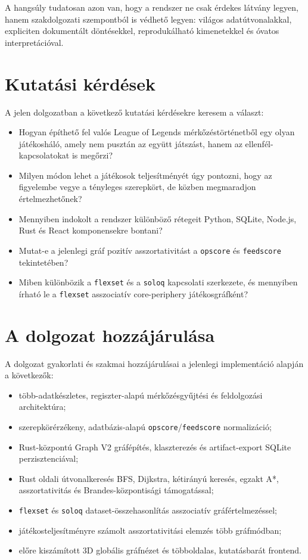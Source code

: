 ﻿\documentclass[a4paper,12pt]{report}
\begin{document}
A hangsúly tudatosan azon van, hogy a rendszer ne csak érdekes látvány legyen, hanem szakdolgozati szempontból is védhető legyen: világos adatútvonalakkal, expliciten dokumentált döntésekkel, reprodukálható kimenetekkel és óvatos interpretációval.

\section{Kutatási kérdések}

A jelen dolgozatban a következő kutatási kérdésekre keresem a választ:

\begin{itemize}
    \item Hogyan építhető fel valós League of Legends mérkőzéstörténetből egy olyan játékosháló, amely nem pusztán az együtt játszást, hanem az ellenfél-kapcsolatokat is megőrzi?
    \item Milyen módon lehet a játékosok teljesítményét úgy pontozni, hogy az figyelembe vegye a tényleges szerepkört, de közben megmaradjon értelmezhetőnek?
    \item Mennyiben indokolt a rendszer különböző rétegeit Python, SQLite, Node.js, Rust és React komponensekre bontani?
    \item Mutat-e a jelenlegi gráf pozitív asszortativitást a \texttt{opscore} és \texttt{feedscore} tekintetében?
    \item Miben különbözik a \texttt{flexset} és a \texttt{soloq} kapcsolati szerkezete, és mennyiben írható le a \texttt{flexset} asszociatív core-periphery játékosgráfként?
\end{itemize}

\section{A dolgozat hozzájárulása}

A dolgozat gyakorlati és szakmai hozzájárulásai a jelenlegi implementáció alapján a következők:

\begin{itemize}
    \item több-adatkészletes, regiszter-alapú mérkőzésgyűjtési és feldolgozási architektúra;
    \item szerepkörérzékeny, adatbázis-alapú \texttt{opscore}/\texttt{feedscore} normalizáció;
    \item Rust-központú Graph V2 gráfépítés, klaszterezés és artifact-export SQLite perzisztenciával;
    \item Rust oldali útvonalkeresés BFS, Dijkstra, kétirányú keresés, egzakt A*, asszortativitás és Brandes-központisági támogatással;
    \item \texttt{flexset} és \texttt{soloq} dataset-összehasonlítás asszociatív gráfértelmezéssel;
    \item játékosteljesítményre számolt asszortativitási elemzés több gráfmódban;
    \item előre kiszámított 3D globális gráfnézet és többoldalas, kutatásbarát frontend.
\end{itemize}
\end{document}
